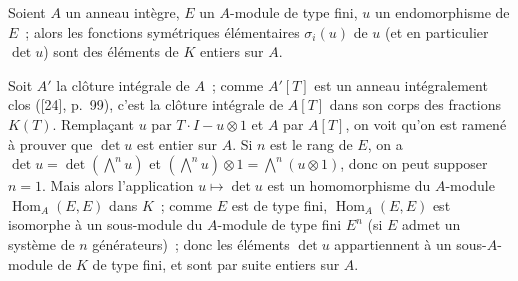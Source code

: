 \begin{proposition}[6.4.3]
\label{II.6.4.3-fr}
Soient $A$ un anneau intègre, $E$ un $A$-module de type fini, $u$ un
endomorphisme de $E$~; alors les fonctions symétriques élémentaires
$\sigma_i(u)$ de $u$ (et en particulier $\det u$) sont des éléments de $K$
entiers sur $A$.
\end{proposition}

Soit $A'$ la clôture intégrale de $A$~; comme $A'[T]$ est un anneau
intégralement clos ([24], p.~99), c'est la clôture intégrale de
$A[T]$ dans son corps des fractions $K(T)$. Remplaçant $u$ par
$T\cdot I-u\otimes1$ et $A$ par $A[T]$, on voit qu'on est ramené à prouver que
$\det u$ est entier sur $A$. Si $n$ est le rang de $E$, on a
$\det u=\det(\bigwedge^n u)$ et
$(\bigwedge^n u)\otimes1=\bigwedge^n(u\otimes1)$, donc on peut supposer
$n=1$. Mais alors l'application $u\mapsto\det u$ est un homomorphisme du
$A$-module $\operatorname{Hom}_A(E,E)$ dans $K$~; comme $E$ est de type fini,
$\operatorname{Hom}_A(E,E)$ est isomorphe à un sous-module du $A$-module de
type fini $E^n$ (si $E$ admet un système de $n$ générateurs)~; donc les
éléments $\det u$ appartiennent à un sous-$A$-module de $K$ de type fini, et
sont par suite entiers sur $A$.

